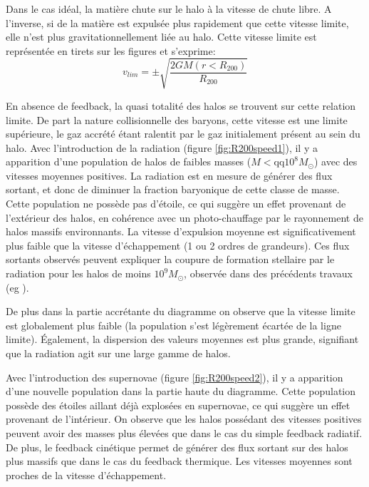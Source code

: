 Dans le cas idéal, la matière chute sur le halo à la vitesse de chute libre.
A l'inverse, si de la matière est expulsée plus rapidement que cette vitesse limite, elle n'est plus gravitationnellement liée au halo.
Cette vitesse limite est représentée en tirets sur les figures et s'exprime:
\begin{equation}
v_{lim} = \pm \sqrt{\frac{2 GM (r<R_{200})} {R_{200}} } 
\end{equation}

En absence de feedback, la quasi totalité des halos se trouvent sur cette relation limite.
De part la nature collisionnelle des baryons, cette vitesse est une limite supérieure, le gaz accrété étant ralentit par le gaz initialement présent au sein du halo.
Avec l'introduction de la radiation (figure \ref{fig:R200speed1}), il y a apparition d'une population de halos de faibles masses ($M< \mathrm{qq} 10^8 M_\odot$) avec des vitesses moyennes positives.
La radiation est en mesure de générer des flux sortant, et donc de diminuer la fraction baryonique de cette classe de masse. 
Cette population ne possède pas d'étoile, ce qui suggère un effet provenant de l'extérieur des halos, en cohérence avec un photo-chauffage par le rayonnement de halos massifs environnants.
La vitesse d'expulsion moyenne est significativement plus faible que la vitesse d'échappement (1 ou 2 ordres de grandeurs).
Ces flux sortants observés peuvent expliquer la coupure de formation stellaire par le radiation pour les halos de moins $10^9 M_\odot$, observée dans des précédents travaux (eg \cite{ocvirk_cosmic_2015}).

De plus dans la partie accrétante du diagramme on observe que la vitesse limite est globalement plus faible (la population s'est légèrement écartée de la ligne limite).
Également, la dispersion des valeurs moyennes est plus grande, signifiant que la radiation agit sur une large gamme de halos.

Avec l'introduction des supernovae (figure \ref{fig:R200speed2}), il y a apparition d'une nouvelle population dans la partie haute du diagramme.
Cette population possède des étoiles aillant déjà explosées en supernovae, ce qui suggère un effet provenant de l'intérieur.
On observe que les halos possédant des vitesses positives peuvent avoir des masses plus élevées que dans le cas du simple feedback radiatif.
De plus, le feedback cinétique permet de générer des flux sortant sur des halos plus massifs que dans le cas du feedback thermique.
Les vitesses moyennes sont proches de la vitesse d'échappement.

